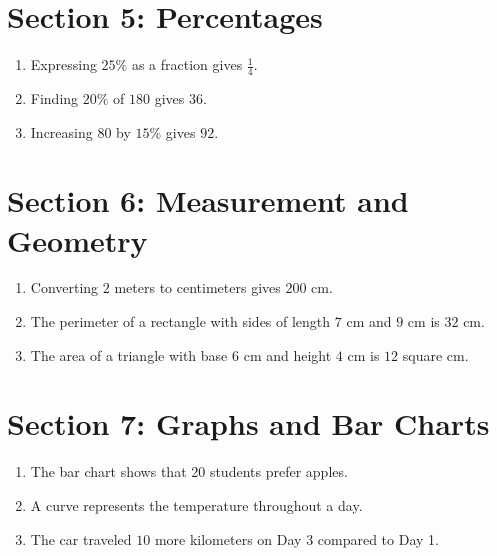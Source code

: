 \documentclass[12pt]{article}
\begin{document}
\section*{Section 5: Percentages}
\begin{enumerate}
  \item Expressing $25\%$ as a fraction gives $\frac{1}{4}$.
  \item Finding $20\%$ of $180$ gives $36$.
  \item Increasing $80$ by $15\%$ gives $92$.
\end{enumerate}

\section*{Section 6: Measurement and Geometry}
\begin{enumerate}
  \item Converting $2$ meters to centimeters gives $200$ cm.
  \item The perimeter of a rectangle with sides of length $7$ cm and $9$ cm is $32$ cm.
  \item The area of a triangle with base $6$ cm and height $4$ cm is $12$ square cm.
\end{enumerate}

\section*{Section 7: Graphs and Bar Charts}
\begin{enumerate}
  \item The bar chart shows that $20$ students prefer apples.
  \item A curve represents the temperature throughout a day.
  \item The car traveled $10$ more kilometers on Day 3 compared to Day 1.
\end{enumerate}
\end{document}
